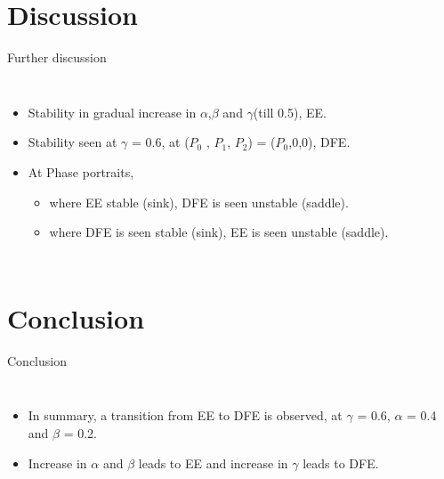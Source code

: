 \documentclass[smaller,aspectratio=169, toc=bibliography]{beamer}
\begin{document}
\section*{Discussion}
\begin{frame}[fragile]{Further discussion}
\begin{columns}[c]
\begin{itemize}
\item Stability in gradual increase in $\alpha$,$\beta$ and $\gamma$(till 0.5), EE. 
\item Stability seen at $\gamma$ = 0.6, at ($P_0$ , $P_1$, $P_2$) = ($P_0$,0,0), DFE.
\item At Phase portraits, 
\begin{itemize}
\item where EE stable (sink), DFE is seen unstable (saddle).
\item where DFE is seen stable (sink), EE is seen unstable (saddle).
\end{itemize}
\end{itemize}
\end{columns}
\end{frame}

\section{Conclusion}		
\begin{frame}[fragile]{Conclusion}
\begin{columns}[c]
\begin{itemize}

\item In summary, a transition from EE to DFE is observed, at $\gamma$ = 0.6, $\alpha$ = 0.4 and $\beta$ = 0.2.
\item Increase in $\alpha$ and $\beta$ leads to EE and increase in $\gamma$ leads to DFE. 
  
 

\end{itemize}
\end{columns}
\end{frame}
\end{document}

